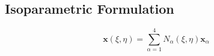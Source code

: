 \hypertarget{isoparametric-formulation}{%
\subsection{Isoparametric Formulation}\label{isoparametric-formulation}}

\[\mathbf{x}(\xi, \eta)=\sum_{\alpha=1}^{4} N_{\alpha}(\xi, \eta) \mathbf{x}_{\alpha}\]
